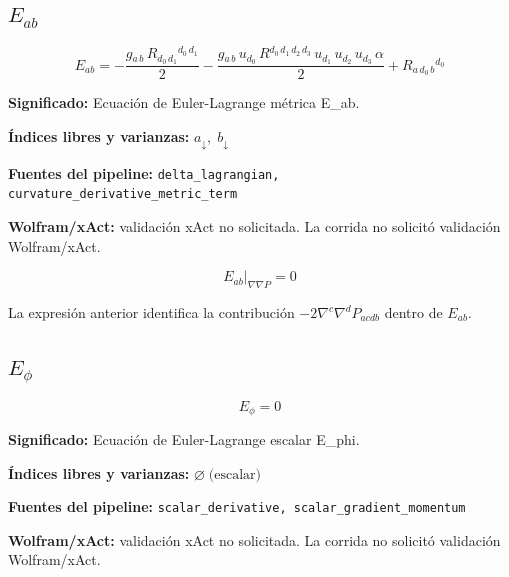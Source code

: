 \documentclass[11pt]{article}
\begin{document}
\subsection*{$ E_{ab} $}
\begin{dmath*}[breakdepth={5}]
E_{ab} = -\frac{g{}_{a\,b}\,R{}_{d_{0}\,d_{1}}{}^{d_{0}\,d_{1}}}{2} - \frac{g{}_{a\,b}\,u{}_{d_{0}}\,R{}^{d_{0}\,d_{1}\,d_{2}\,d_{3}}\,u{}_{d_{1}}\,u{}_{d_{2}}\,u{}_{d_{3}}\,\alpha}{2} + R{}_{a\,d_{0}\,b}{}^{d_{0}}
\end{dmath*}
\par\vspace{1.2\baselineskip}\noindent
\begin{minipage}{\linewidth}
\textbf{Significado:} Ecuación de Euler-Lagrange métrica E\_ab.\par
\textbf{Índices libres y varianzas:} $ a_{\downarrow},\;b_{\downarrow} $\par
\textbf{Fuentes del pipeline:} \texttt{delta\_lagrangian, curvature\_derivative\_metric\_term}\par
\textbf{Wolfram/xAct:} validación xAct no solicitada. La corrida no solicitó validación Wolfram/xAct.\par
\end{minipage}
\begin{dmath*}[breakdepth={5}]
\left.E_{ab}\right|_{\nabla\nabla P} = 0
\end{dmath*}
\par\vspace{0.8\baselineskip}\noindent
\begin{minipage}{\linewidth}
La expresión anterior identifica la contribución $-2\nabla^c\nabla^dP_{acdb}$ dentro de $E_{ab}$.\par
\end{minipage}
\subsection*{$ E_{\phi} $}
\begin{dmath*}[breakdepth={5}]
E_{\phi} = 0
\end{dmath*}
\par\vspace{1.2\baselineskip}\noindent
\begin{minipage}{\linewidth}
\textbf{Significado:} Ecuación de Euler-Lagrange escalar E\_phi.\par
\textbf{Índices libres y varianzas:} $ \varnothing\;\text{(escalar)} $\par
\textbf{Fuentes del pipeline:} \texttt{scalar\_derivative, scalar\_gradient\_momentum}\par
\textbf{Wolfram/xAct:} validación xAct no solicitada. La corrida no solicitó validación Wolfram/xAct.\par
\end{minipage}
\end{document}
